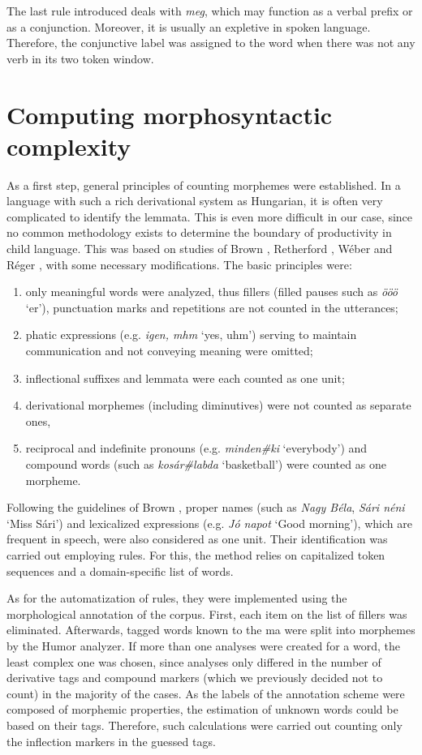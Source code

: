 The last rule introduced deals with \textit{meg}, which may function as a verbal prefix or as a conjunction.  
Moreover, it is usually an expletive in spoken language.
Therefore, the conjunctive label was assigned to the word when there was not any verb in its two token window.

\section{Computing morphosyntactic complexity}

As a first step, general principles of counting morphemes were established. 
In a language with such a rich derivational system as Hungarian, it is often very complicated to identify the lemmata. 
This is even more difficult in our case, since no common methodology exists to determine the boundary of productivity in child language. 
This was based on studies of Brown \cite{Brown1973}, Retherford \cite{retherford1993guide}, Wéber \cite{Weber2011} and Réger \cite{Reger1990}, with some necessary modifications. 
The basic principles were: 
\begin{enumerate}
 \item only meaningful words were analyzed, thus fillers (filled pauses such as \textit{ööö} `er’), punctuation marks and repetitions are not counted in the utterances;
 \item phatic expressions (e.g. \textit{igen, mhm} `yes, uhm’) serving to maintain communication and not conveying meaning were omitted;
 \item inflectional suffixes and lemmata were each counted as one unit; 
 \item derivational morphemes (including diminutives) were not counted as separate ones,
 \item reciprocal and indefinite pronouns (e.g. \textit{minden\#ki} `everybody’) and compound words (such as \textit{kosár\#labda} `basketball’) were counted as one morpheme.
 \end{enumerate}
 
Following the guidelines of Brown \cite{Brown1973}, proper names (such as \textit{Nagy Béla}, \textit{Sári néni} `Miss Sári’) and lexicalized expressions (e.g. \textit{Jó napot} `Good morning’), which are frequent in speech, were also considered as one unit. 
Their identification was carried out employing rules. 
For this, the method relies on capitalized token sequences and a domain-specific list of words.

As for the automatization of rules, they were implemented using the morphological annotation of the corpus. 
First, each item on the list of fillers was eliminated.
Afterwards, tagged words known to the \acrshort{ma} were split into morphemes by the Humor analyzer. 
If more than one analyses were created for a word, the least complex one was chosen, since analyses only differed in the number of derivative tags and compound markers (which we previously decided not to count) in the majority of the cases.
As the labels of the annotation scheme were composed of morphemic properties, the estimation of unknown words could be based on their tags. 
Therefore, such calculations were carried out counting only the inflection markers in the guessed tags. 

